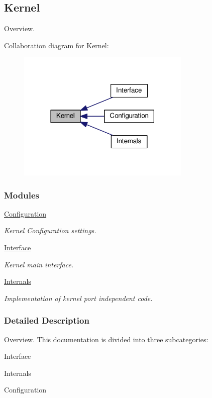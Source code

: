 \hypertarget{group__kernel}{\subsection{Kernel}
\label{group__kernel}
}


Overview.  


Collaboration diagram for Kernel\-:\nopagebreak
\begin{figure}[H]
\begin{center}
\leavevmode
\includegraphics[width=234pt]{group__kernel}
\end{center}
\end{figure}
\subsubsection*{Modules}
\begin{DoxyCompactItemize}
\item 
\hyperlink{group__kern__cfg}{Configuration}
\begin{DoxyCompactList}\small\item\em Kernel Configuration settings. \end{DoxyCompactList}\item 
\hyperlink{group__kern__intf}{Interface}
\begin{DoxyCompactList}\small\item\em Kernel main interface. \end{DoxyCompactList}\item 
\hyperlink{group__kern__impl}{Internals}
\begin{DoxyCompactList}\small\item\em Implementation of kernel port independent code. \end{DoxyCompactList}\end{DoxyCompactItemize}


\subsubsection{Detailed Description}
Overview. This documentation is divided into three subcategories\-:
\begin{DoxyItemize}
\item Interface
\item Internals
\item Configuration 
\end{DoxyItemize}